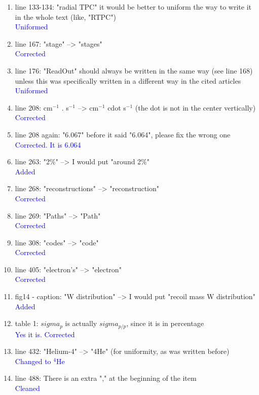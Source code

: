 \documentclass[a4paper,11pt,twoside]{article}
\begin{document}
\begin{enumerate}
\item line 133-134: "radial TPC" it would be better to uniform the way to write 
   it in the whole text (like, "RTPC")\\
\textcolor{blue}{Uniformed} 

\item line 167: "stage" --> "stages"\\
\textcolor{blue}{Corrected} 

\item line 176: "ReadOut" should always be written in the same way (see line 
   168) unless this was specifically written in a different way in the cited 
   articles\\
\textcolor{blue}{Uniformed} 

\item line 208: cm$^{-1}$ . s$^{-1}$ --> cm$^{-1}$ cdot s$^{-1}$ (the dot is 
   not in the center vertically)\\
\textcolor{blue}{Corrected} 

\item line 208 again: "6.067" before it said "6.064", please fix the wrong one
\textcolor{blue}{Corrected. It is 6.064} \\

\item line 263: "2\%" --> I would put "around 2\%"\\
\textcolor{blue}{Added} 

\item line 268: "reconstructions" --> "reconstruction"\\
\textcolor{blue}{Corrected } 

\item line 269: "Paths" --> "Path"\\
\textcolor{blue}{Corrected} 

\item line 308: "codes" --> "code"\\
\textcolor{blue}{Corrected} 

\item line 405: "electron's" --> "electron"\\
\textcolor{blue}{Corrected} 

\item fig14 - caption: "W distribution" --> I would put "recoil mass W 
   distribution"\\
\textcolor{blue}{Added} 

\item table 1: $sigma_{p}$ is actually $sigma_{p/p}$, since it is in 
   percentage\\
\textcolor{blue}{Yes it is. Corrected } 

\item line 432: "Helium-4" --> "4He" (for uniformity, as was written before)\\
\textcolor{blue}{Changed to $^4$He} 

\item line 488: There is an extra "," at the beginning of the item\\
\textcolor{blue}{Cleaned}\\
~\\
\end{enumerate}
\end{document}
